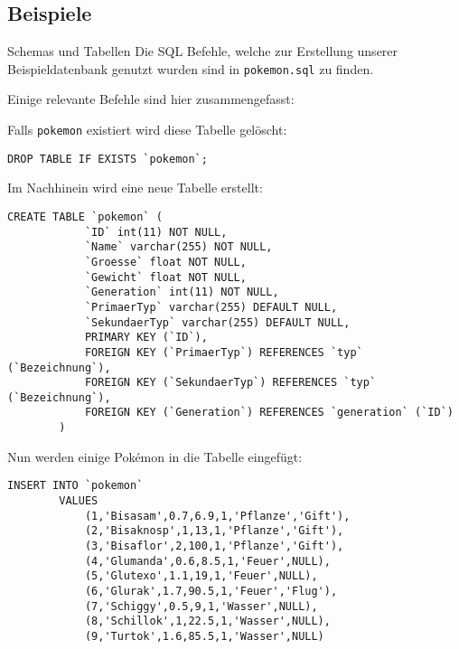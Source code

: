 \subsection{Beispiele}

\begin{example}{Schemas und Tabellen}
    Die SQL Befehle, welche zur Erstellung unserer Beispieldatenbank genutzt wurden sind in \texttt{pokemon.sql} zu finden.

    Einige relevante Befehle sind hier zusammengefasst:

    Falls \texttt{pokemon} existiert wird diese Tabelle gelöscht:

    \begin{lstlisting}[language=mysql]
        DROP TABLE IF EXISTS `pokemon`;
    \end{lstlisting}

    Im Nachhinein wird eine neue Tabelle erstellt:

    \begin{lstlisting}[language=mysql]
        CREATE TABLE `pokemon` (
            `ID` int(11) NOT NULL,
            `Name` varchar(255) NOT NULL,
            `Groesse` float NOT NULL,
            `Gewicht` float NOT NULL,
            `Generation` int(11) NOT NULL,
            `PrimaerTyp` varchar(255) DEFAULT NULL,
            `SekundaerTyp` varchar(255) DEFAULT NULL,
            PRIMARY KEY (`ID`),
            FOREIGN KEY (`PrimaerTyp`) REFERENCES `typ` (`Bezeichnung`),
            FOREIGN KEY (`SekundaerTyp`) REFERENCES `typ` (`Bezeichnung`),
            FOREIGN KEY (`Generation`) REFERENCES `generation` (`ID`)
        )
    \end{lstlisting}

    Nun werden einige Pokémon in die Tabelle eingefügt:

    \begin{lstlisting}[language=mysql]
        INSERT INTO `pokemon`
        VALUES
            (1,'Bisasam',0.7,6.9,1,'Pflanze','Gift'),
            (2,'Bisaknosp',1,13,1,'Pflanze','Gift'),
            (3,'Bisaflor',2,100,1,'Pflanze','Gift'),
            (4,'Glumanda',0.6,8.5,1,'Feuer',NULL),
            (5,'Glutexo',1.1,19,1,'Feuer',NULL),
            (6,'Glurak',1.7,90.5,1,'Feuer','Flug'),
            (7,'Schiggy',0.5,9,1,'Wasser',NULL),
            (8,'Schillok',1,22.5,1,'Wasser',NULL),
            (9,'Turtok',1.6,85.5,1,'Wasser',NULL)
    \end{lstlisting}
\end{example}